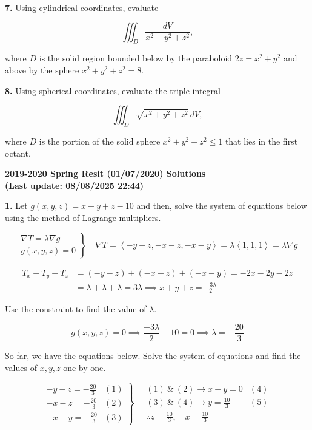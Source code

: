 \documentclass{article}
\begin{document}
\textbf{7.} Using cylindrical coordinates, evaluate

\[\iiint_D\frac{dV}{x^2+y^2+z^2},\]

where $D$ is the solid region bounded below by the paraboloid $2z=x^2+y^2$ and above by the sphere $x^2+y^2+z^2=8$.

\vspace{1em}

\textbf{8.} Using spherical coordinates, evaluate the triple integral

\[\iiint_D\sqrt{x^2+y^2+z^2}\,dV,\]

where $D$ is the portion of the solid sphere $x^2+y^2+z^2\leq1$ that lies in the first octant.

\newpage

\begin{center}
\textbf{2019-2020 Spring Resit (01/07/2020) Solutions\\
(Last update: 08/08/2025 22:44)}
\end{center}

\textbf{1.} Let $g(x,y,z)=x+y+z-10$ and then, solve the system of equations below using the method of Lagrange multipliers.

\[
\left.
\begin{array}{ll}
\displaystyle\nabla T =\lambda \nabla g\\
\displaystyle g(x,y,z) = 0
\end{array}
\right\}\quad
\nabla T = \left\langle-y-z,-x-z,-x-y\right\rangle=\lambda\left\langle1,1,1\right\rangle= \lambda\nabla g
\]

\begin{align*}T_x+T_y + T_z&=(-y-z) +(-x-z) +(-x-y)=-2x-2y-2z\\&=\lambda+\lambda+\lambda=3\lambda\implies x+y+z=\frac{-3\lambda}{2}\end{align*}

Use the constraint to find the value of $\lambda$.

\[g(x,y,z) = 0 \implies \frac{-3\lambda}{2}-10=0\implies \lambda=-\frac{20}{3}\]

So far, we have the equations below. Solve the system of equations and find the values of $x,y,z$ one by one.

\[
\left.
\begin{array}{ll}
\displaystyle -y-z=-\frac{20}{3}&(1)\\[0.5cm]
\displaystyle -x-z=-\frac{20}{3}&(2)\\[0.5cm]
\displaystyle -x-y=-\frac{20}{3}&(3)
\end{array}
\right\}\quad
\begin{array}{ll}
\displaystyle (1)\:\&\:(2)\rightarrow x-y=0 & (4) \\[0.2cm]
\displaystyle (3)\:\&\:(4)\rightarrow y=\frac{10}{3}&(5)\\[0.5cm]
\displaystyle\therefore z=\frac{10}{3},\quad x=\frac{10}{3}
\end{array}
\]
\end{document}
